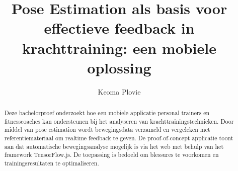 \documentclass[a0,portrait]{hogent-poster}
\title{Pose Estimation als basis voor effectieve feedback in krachttraining: een mobiele oplossing}
\subtitle{}
\author{Keoma Plovie}
\begin{document}
\maketitle

\begin{abstract}
Deze bachelorproef onderzoekt hoe een mobiele applicatie personal trainers en fitnesscoaches kan ondersteunen bij het analyseren van krachttrainingstechnieken. 
Door middel van pose estimation wordt bewegingsdata verzameld en vergeleken met referentiemateriaal om realtime feedback te geven. 
De proof-of-concept applicatie toont aan dat automatische bewegingsanalyse mogelijk is via het web met behulp van het framework TensorFlow.js. 
De toepassing is bedoeld om blessures te voorkomen en trainingsresultaten te optimaliseren.

\end{abstract}
\end{document}
